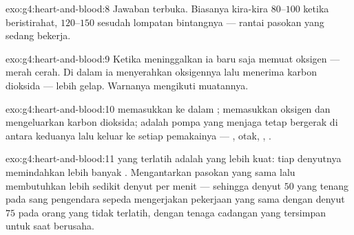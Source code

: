 \begin{solution}{exo:g4:heart-and-blood:8}
Jawaban terbuka. Biasanya kira-kira $80$--$100$ ketika beristirahat,
$120$--$150$ sesudah lompatan bintangnya --- rantai pasokan yang
sedang bekerja.
\end{solution}

\begin{solution}{exo:g4:heart-and-blood:9}
Ketika meninggalkan  ia baru saja memuat oksigen --- merah
cerah. Di dalam  ia menyerahkan oksigennya lalu menerima karbon
dioksida --- lebih gelap. Warnanya mengikuti muatannya.
\end{solution}

\begin{solution}{exo:g4:heart-and-blood:10}
 memasukkan  ke dalam ;  memasukkan
oksigen dan mengeluarkan karbon dioksida;  adalah pompa yang
menjaga  tetap bergerak di antara keduanya lalu keluar ke
setiap pemakainya --- , otak, , .
\end{solution}

\begin{solution}{exo:g4:heart-and-blood:11}
 yang terlatih adalah  yang lebih kuat: tiap denyutnya
memindahkan lebih banyak . Mengantarkan pasokan yang sama lalu
membutuhkan lebih sedikit denyut per menit --- sehingga denyut $50$
yang tenang pada sang pengendara sepeda mengerjakan pekerjaan yang
sama dengan denyut $75$ pada orang yang tidak terlatih, dengan tenaga
cadangan yang tersimpan untuk saat berusaha.
\end{solution}
